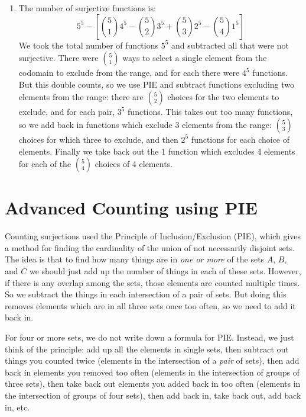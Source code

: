 \documentclass[12pt]{article}
\begin{document}
\begin{example}
\begin{solution}
\begin{enumerate}
    \item The number of surjective functions is:
    \[5^5 - \left[{5 \choose 1}4^5 - {5 \choose 2}3^5 + {5 \choose 3}2^5 - {5 \choose 4}1^5\right]\]
    We took the total number of functions $5^5$ and subtracted all that were not surjective.  There were ${5 \choose 1}$ ways to select a single element from the codomain to exclude from the range, and for each there were $4^5$ functions.  But this double counts, so we use PIE and subtract functions excluding two elements from the range: there are ${5 \choose 2}$ choices for the two elements to exclude, and for each pair, $3^5$ functions.  This takes out too many functions, so we add back in functions which exclude 3 elements from the range: ${5 \choose 3}$ choices for which three to exclude, and then $2^5$ functions for each choice of elements.  Finally we take back out the 1 function which excludes 4 elements for each of the ${5 \choose 4}$ choices of 4 elements.
  \end{enumerate}

\end{solution}

\end{example}


\section{Advanced Counting using PIE}

Counting surjections used the Principle of Inclusion/Exclusion (PIE), which gives a method for finding the cardinality of the union of not necessarily disjoint sets. The idea is that to find how many things are in {\em one or more} of the sets $A$, $B$, and $C$ we should just add up the number of things in each of these sets.  However, if there is any overlap among the sets, those elements are counted multiple times.  So we subtract the things in each intersection of a pair of sets.  But doing this removes elements which are in all three sets once too often, so we need to add it back in.

For four or more sets, we do not write down a formula for PIE.  Instead, we just think of the principle: add up all the elements in single sets, then subtract out things you counted twice (elements in the intersection of a {\em pair} of sets), then add back in elements you removed too often (elements in the intersection of groups of three sets), then take back out elements you added back in too often (elements in the intersection of groups of four sets), then add back in, take back out, add back in, etc.  
\end{document}
